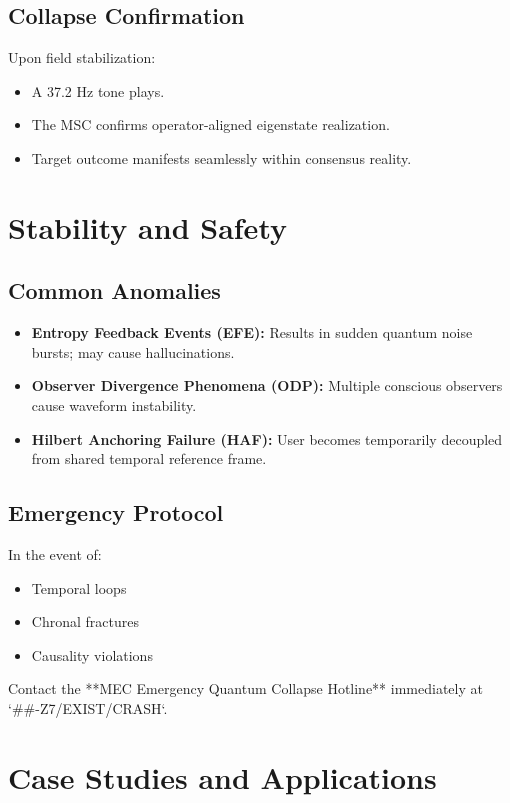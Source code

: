 \documentclass[12pt]{article}
\begin{document}
\subsection{Collapse Confirmation}
Upon field stabilization:
\begin{itemize}
    \item A 37.2 Hz tone plays.
    \item The MSC confirms operator-aligned eigenstate realization.
    \item Target outcome manifests seamlessly within consensus reality.
\end{itemize}

\section{Stability and Safety}

\subsection{Common Anomalies}
\begin{itemize}
    \item \textbf{Entropy Feedback Events (EFE):} Results in sudden quantum noise bursts; may cause hallucinations.
    \item \textbf{Observer Divergence Phenomena (ODP):} Multiple conscious observers cause waveform instability.
    \item \textbf{Hilbert Anchoring Failure (HAF):} User becomes temporarily decoupled from shared temporal reference frame.
\end{itemize}

\subsection{Emergency Protocol}
In the event of:

\begin{itemize}
    \item Temporal loops
    \item Chronal fractures
    \item Causality violations
\end{itemize}

\noindent Contact the **MEC Emergency Quantum Collapse Hotline** immediately at `##-Z7/EXIST/CRASH`.

\section{Case Studies and Applications}
\end{document}
